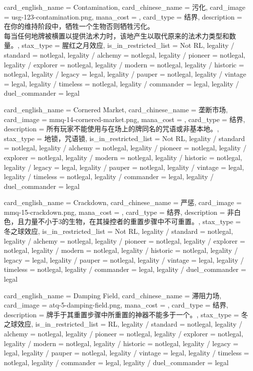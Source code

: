 \documentclass[lang = cn, color = black, 10pt]{AllThatStax}
\begin{document}
\card
{
	card_english_name = {Contamination},
	card_chinese_name = {污化},
	card_image = usg-123-contamination.png,
	mana_cost = ,
	card_type = 结界,
	description = {在你的维持阶段中，牺牲一个生物否则牺牲污化。\\
每当任何地牌被横置以提供法术力时，该地产生以取代原来的法术力类型和数量。},
	stax_type = 腥红之月效应,
	is_in_restricted_list = Not RL,
	legality / standard = notlegal,
	legality / alchemy = notlegal,
	legality / pioneer = notlegal,
	legality / explorer = notlegal,
	legality / modern = notlegal,
	legality / historic = notlegal,
	legality / legacy = legal,
	legality / pauper = notlegal,
	legality / vintage = legal,
	legality / timeless = notlegal,
	legality / commander = legal,
	legality / duel_commander = legal
}

\card
{
	card_english_name = {Cornered Market},
	card_chinese_name = {垄断市场},
	card_image = mmq-14-cornered-market.png,
	mana_cost = ,
	card_type = 结界,
	description = {所有玩家不能使用与在场上的牌同名的咒语或非基本地。},
	stax_type = 地锁，咒语锁,
	is_in_restricted_list = Not RL,
	legality / standard = notlegal,
	legality / alchemy = notlegal,
	legality / pioneer = notlegal,
	legality / explorer = notlegal,
	legality / modern = notlegal,
	legality / historic = notlegal,
	legality / legacy = legal,
	legality / pauper = notlegal,
	legality / vintage = legal,
	legality / timeless = notlegal,
	legality / commander = legal,
	legality / duel_commander = legal
}

\card
{
	card_english_name = {Crackdown},
	card_chinese_name = {严惩},
	card_image = mmq-15-crackdown.png,
	mana_cost = ,
	card_type = 结界,
	description = {非白色，且力量不小于3的生物，在其操控者的重置步骤中不可重置。},
	stax_type = 冬之球效应,
	is_in_restricted_list = Not RL,
	legality / standard = notlegal,
	legality / alchemy = notlegal,
	legality / pioneer = notlegal,
	legality / explorer = notlegal,
	legality / modern = notlegal,
	legality / historic = notlegal,
	legality / legacy = legal,
	legality / pauper = notlegal,
	legality / vintage = legal,
	legality / timeless = notlegal,
	legality / commander = legal,
	legality / duel_commander = legal
}

\card
{
	card_english_name = {Damping Field},
	card_chinese_name = {滞阻力场},
	card_image = atq-5-damping-field.png,
	mana_cost = ,
	card_type = 结界,
	description = {牌手于其重置步骤中所重置的神器不能多于一个。},
	stax_type = 冬之球效应,
	is_in_restricted_list = RL,
	legality / standard = notlegal,
	legality / alchemy = notlegal,
	legality / pioneer = notlegal,
	legality / explorer = notlegal,
	legality / modern = notlegal,
	legality / historic = notlegal,
	legality / legacy = legal,
	legality / pauper = notlegal,
	legality / vintage = legal,
	legality / timeless = notlegal,
	legality / commander = legal,
	legality / duel_commander = legal
}
\end{document}
